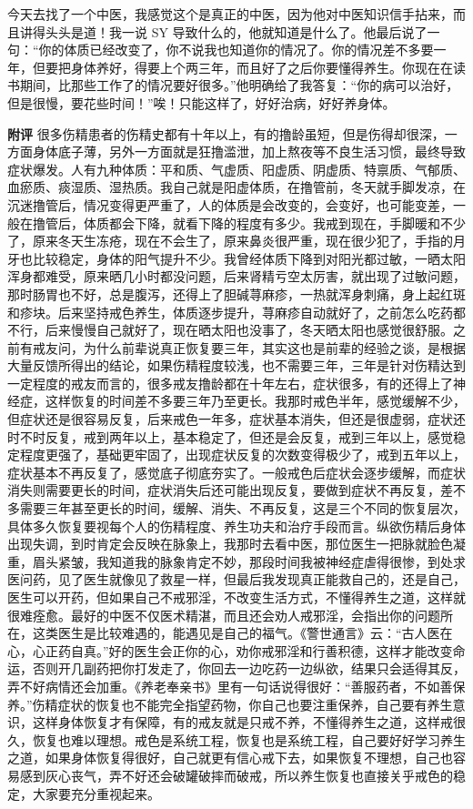 \begin{case}
    今天去找了一个中医，我感觉这个是真正的中医，因为他对中医知识信手拈来，而且讲得头头是道！我一说 SY 导致什么的，他就知道是什么了。他最后说了一句：“你的体质已经改变了，你不说我也知道你的情况了。你的情况差不多要一年，但要把身体养好，得要上个两三年，而且好了之后你要懂得养生。你现在在读书期间，比那些工作了的情况要好很多。”他明确给了我答复：“你的病可以治好，但是很慢，要花些时间！”唉！只能这样了，好好治病，好好养身体。

    \textbf{附评} 很多伤精患者的伤精史都有十年以上，有的撸龄虽短，但是伤得却很深，一方面身体底子薄，另外一方面就是狂撸滥泄，加上熬夜等不良生活习惯，最终导致症状爆发。人有九种体质：平和质、气虚质、阳虚质、阴虚质、特禀质、气郁质、血瘀质、痰湿质、湿热质。我自己就是阳虚体质，在撸管前，冬天就手脚发凉，在沉迷撸管后，情况变得更严重了，人的体质是会改变的，会变好，也可能变差，一般在撸管后，体质都会下降，就看下降的程度有多少。我戒到现在，手脚暖和不少了，原来冬天生冻疮，现在不会生了，原来鼻炎很严重，现在很少犯了，手指的月牙也比较稳定，身体的阳气提升不少。我曾经体质下降到对阳光都过敏，一晒太阳浑身都难受，原来晒几小时都没问题，后来肾精亏空太厉害，就出现了过敏问题，那时肠胃也不好，总是腹泻，还得上了胆碱荨麻疹，一热就浑身刺痛，身上起红斑和疹块。后来坚持戒色养生，体质逐步提升，荨麻疹自动就好了，之前怎么吃药都不行，后来慢慢自己就好了，现在晒太阳也没事了，冬天晒太阳也感觉很舒服。之前有戒友问，为什么前辈说真正恢复要三年，其实这也是前辈的经验之谈，是根据大量反馈所得出的结论，如果伤精程度较浅，也不需要三年，三年是针对伤精达到一定程度的戒友而言的，很多戒友撸龄都在十年左右，症状很多，有的还得上了神经症，这样恢复的时间差不多要三年乃至更长。我那时戒色半年，感觉缓解不少，但症状还是很容易反复，后来戒色一年多，症状基本消失，但还是很虚弱，症状还时不时反复，戒到两年以上，基本稳定了，但还是会反复，戒到三年以上，感觉稳定程度更强了，基础更牢固了，出现症状反复的次数变得极少了，戒到五年以上，症状基本不再反复了，感觉底子彻底夯实了。一般戒色后症状会逐步缓解，而症状消失则需要更长的时间，症状消失后还可能出现反复，要做到症状不再反复，差不多需要三年甚至更长的时间，缓解、消失、不再反复，这是三个不同的恢复层次，具体多久恢复要视每个人的伤精程度、养生功夫和治疗手段而言。纵欲伤精后身体出现失调，到时肯定会反映在脉象上，我那时去看中医，那位医生一把脉就脸色凝重，眉头紧皱，我知道我的脉象肯定不妙，那段时间我被神经症虐得很惨，到处求医问药，见了医生就像见了救星一样，但最后我发现真正能救自己的，还是自己，医生可以开药，但如果自己不戒邪淫，不改变生活方式，不懂得养生之道，这样就很难痊愈。最好的中医不仅医术精湛，而且还会劝人戒邪淫，会指出你的问题所在，这类医生是比较难遇的，能遇见是自己的福气。《警世通言》云：“古人医在心，心正药自真。”好的医生会正你的心，劝你戒邪淫和行善积德，这样才能改变命运，否则开几副药把你打发走了，你回去一边吃药一边纵欲，结果只会适得其反，弄不好病情还会加重。《养老奉亲书》里有一句话说得很好：“善服药者，不如善保养。”伤精症状的恢复也不能完全指望药物，你自己也要注重保养，自己要有养生意识，这样身体恢复才有保障，有的戒友就是只戒不养，不懂得养生之道，这样戒很久，恢复也难以理想。戒色是系统工程，恢复也是系统工程，自己要好好学习养生之道，如果身体恢复得很好，自己就更有信心戒下去，如果恢复不理想，自己也容易感到灰心丧气，弄不好还会破罐破摔而破戒，所以养生恢复也直接关乎戒色的稳定，大家要充分重视起来。
\end{case}

